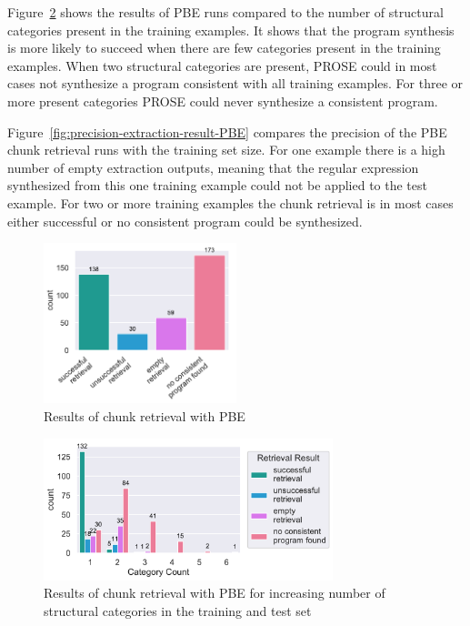 \documentclass[\myrootdir/main.tex]{subfiles}
\begin{document}
Figure~\ref{fig:failure-reason-categorycount-PBE} shows the results of PBE runs compared to the number of structural categories present in the training examples.
It shows that the program synthesis is more likely to succeed when there are few categories present in the training examples.
When two structural categories are present, PROSE could in most cases not synthesize a program consistent with all training examples.
For three or more present categories PROSE could never synthesize a consistent program.

Figure~\ref{fig:precision-extraction-result-PBE} compares the precision of the PBE chunk retrieval runs with the training set size.
For one example there is a high number of empty extraction outputs, meaning that the regular expression synthesized from this one training example could not be applied to the test example.
For two or more training examples the chunk retrieval is in most cases either successful or no consistent program could be synthesized.

\begin{figure}[htbp]
		\centering
		\includegraphics[width=0.5\textwidth, clip]{img/big-study/failure-reason-PBE.pdf}
		\caption{Results of chunk retrieval with PBE}
		\label{fig:failure-reason-PBE}
\end{figure}

\begin{figure}[htbp]
		\centering
		\includegraphics[width=0.75\textwidth, clip]{img/big-study/failure-reason-categorycount-PBE.pdf}
		\caption{Results of chunk retrieval with PBE for increasing number of structural categories in the training and test set}
		\label{fig:failure-reason-categorycount-PBE}
\end{figure}
\end{document}
